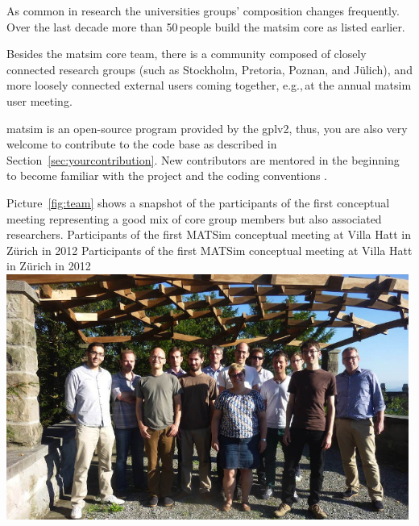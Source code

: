 As common in research the universities groups' composition changes frequently. Over the last decade more than 50\,people build the \gls{matsim} core as listed earlier.

Besides the \gls{matsim} core team, there is a community composed of closely connected research groups (such as Stockholm, Pretoria, Poznan, and Jülich),
and more loosely connected external users coming together, e.g.,\,at the annual \gls{matsim} user meeting.   

\gls{matsim} is an open-source program provided by the \gls{gplv2}, thus, you are also very welcome to contribute to the code base as described in Section~\ref{sec:yourcontribution}. New contributors are mentored in the beginning \citep[][]{MATSIM-BecomingAContributor_Webpage_2015} to become familiar with the project and the coding conventions \citep[][]{MATSIM-CodingGuide_Webpage_2015}.

Picture~\ref{fig:team} shows a snapshot of the participants of the first conceptual meeting representing a good mix of core group members but also associated researchers.
%
\createfigure%
{Participants of the first MATSim conceptual meeting at Villa Hatt in Zürich in 2012}%
{Participants of the first MATSim conceptual meeting at Villa Hatt in Zürich in 2012}%
{\label{fig:team}}%
{\includegraphics[width=0.99\textwidth, angle=0]{extending/figures/ConceptualMeetingVillaHatt.png}}%
{}

